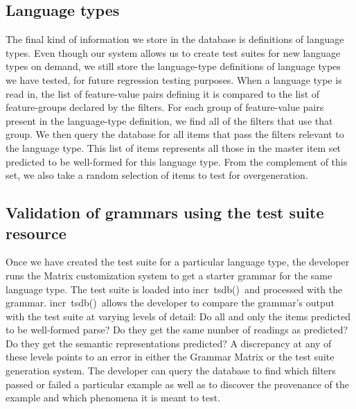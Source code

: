 \documentclass[11pt]{article}
\newcommand{\itsdb}{\mbox{\sf \lbrack incr tsdb()\rbrack}}
\begin{document}
\subsection{Language types}

The final kind of information we store in the database is definitions
of language types.  Even though our system allows us to create test
suites for new language types on demand, we still store the
language-type definitions of language types we have tested, for future
regression testing purposes.  When a language type is read in, the
list of feature-value pairs defining it is compared to the list of
feature-groups declared by the filters.  For each group of
feature-value pairs present in the language-type definition, we find
all of the filters that use that group.  We then query the database
for all items that pass the filters relevant to the language type.
This list of items represents all those in the master item set
predicted to be well-formed for this language type.  From the
complement of this set, we also take a random selection of items to
test for overgeneration.

\subsection{Validation of grammars using the test suite resource}


Once we have created the test suite for a particular language type,
the developer runs the Matrix customization system to get a starter
grammar for the same language type.  The test suite is loaded into
\itsdb\ and processed with the grammar.  \itsdb\ allows the developer
to compare the grammar's output with the test suite at varying levels
of detail: Do all and only the items predicted to be well-formed
parse?  Do they get the same number of readings as predicted?  Do they
get the semantic representations predicted?  A discrepancy at any of
these levels points to an error in either the Grammar Matrix or the
test suite generation system.  The developer can query the database to
find which filters passed or failed a particular example as well as to
discover the provenance of the example and which phenomena it is meant
to test.

\end{document}

